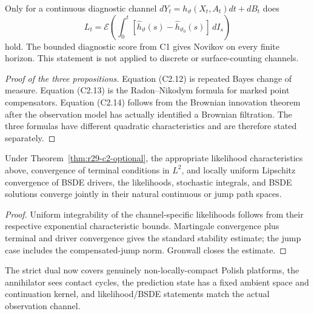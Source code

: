 \begin{proposition}
\label{prop:r29-c2-brownian}
Only for a continuous diagnostic channel
$dY_t=h_\vartheta(X_t,A_t)dt+dB_t$ does
\[
 L_t=\mathcal E\left(\int_0^t
       [\widehat h_\vartheta(s)-\widehat h_{\vartheta_0}(s)]\,dI_s\right)
                                                                    \tag{C2.14}
\]
hold.  The bounded diagnostic score from C1 gives Novikov on every finite
horizon.  This statement is not applied to discrete or surface-counting
channels.
\end{proposition}

\begin{proof}[Proof of the three propositions]
Equation (C2.12) is repeated Bayes change of measure.  Equation (C2.13) is the
Radon--Nikodym formula for marked point compensators.  Equation (C2.14) follows
from the Brownian innovation theorem after the observation model has actually
identified a Brownian filtration.  The three formulas have different
quadratic characteristics and are therefore stated separately.
\end{proof}

\begin{corollary}
\label{cor:r29-c2-bsde}
Under Theorem~\ref{thm:r29-c2-optional}, the appropriate likelihood
characteristics above, convergence of terminal conditions in $L^2$, and
locally uniform Lipschitz convergence of BSDE drivers, the likelihoods,
stochastic integrals, and BSDE solutions converge jointly in their natural
continuous or jump path spaces.
\end{corollary}

\begin{proof}
Uniform integrability of the channel-specific likelihoods follows from their
respective exponential characteristic bounds.  Martingale convergence plus
terminal and driver convergence gives the standard stability estimate; the
jump case includes the compensated-jump norm.  Gronwall closes the estimate.
\end{proof}

The strict dual now covers genuinely non-locally-compact Polish platforms, the
annihilator sees contact cycles, the prediction state has a fixed ambient
space and continuation kernel, and likelihood/BSDE statements match the
actual observation channel.
